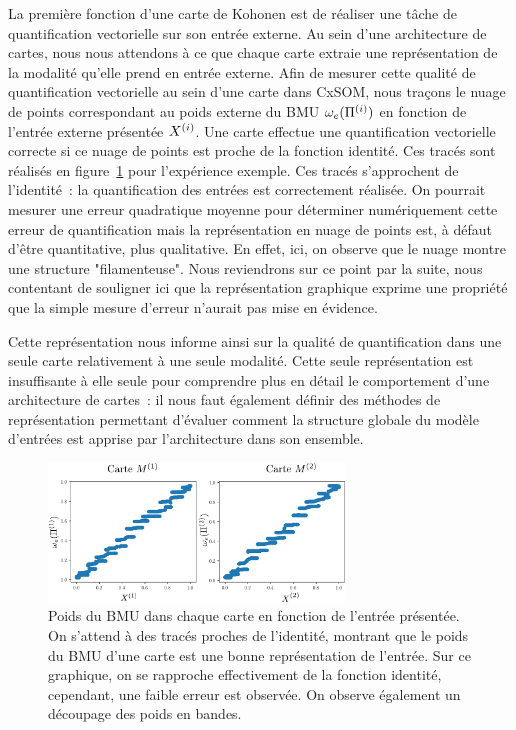\documentclass[../main]{subfiles}
\begin{document}
La première fonction d'une carte de Kohonen est de réaliser une tâche de quantification vectorielle sur son entrée externe. Au sein d'une architecture de cartes, nous nous attendons à ce que chaque carte extraie une représentation de la modalité qu'elle prend en entrée externe.
Afin de mesurer cette qualité de quantification vectorielle au sein d'une carte dans CxSOM, nous traçons le nuage de points correspondant au poids externe du BMU $\omega_e(\Pi^{({i})})$ en fonction de l'entrée externe présentée $X^{({i})}$. Une carte effectue une quantification vectorielle correcte si ce nuage de points est proche de la fonction identité.
Ces tracés sont réalisés en figure~\ref{fig:erreur} pour l'expérience exemple. Ces tracés s'approchent de l'identité~: la quantification des entrées est correctement réalisée.
On pourrait mesurer une erreur quadratique moyenne pour déterminer numériquement cette erreur de quantification mais la représentation en nuage de points est, à défaut d'être quantitative, plus qualitative. En effet, ici, on observe que le nuage montre une structure "filamenteuse". Nous reviendrons sur ce point par la suite, nous contentant de souligner ici que la représentation graphique exprime une propriété que la simple mesure d'erreur n'aurait pas mise en évidence. 

Cette représentation nous informe ainsi sur la qualité de quantification dans une seule carte relativement à une seule modalité. Cette seule représentation est insuffisante à elle seule pour comprendre plus en détail le comportement d'une architecture de cartes~: il nous faut également définir des méthodes de représentation permettant d'évaluer comment la structure globale du modèle d'entrées est apprise par l'architecture dans son ensemble.

\begin{figure}
    \centering
    \includegraphics[width=0.7\textwidth]{w_x.pdf}
    \caption{Poids du BMU dans chaque carte en fonction de l'entrée présentée. On s'attend à des tracés proches de l'identité, montrant que le poids du BMU d'une carte est une bonne représentation de l'entrée. Sur ce graphique, on se rapproche effectivement de la fonction identité, cependant, une faible erreur est observée. On observe également un découpage des poids en bandes.\label{fig:erreur}}
\end{figure}
\end{document}
